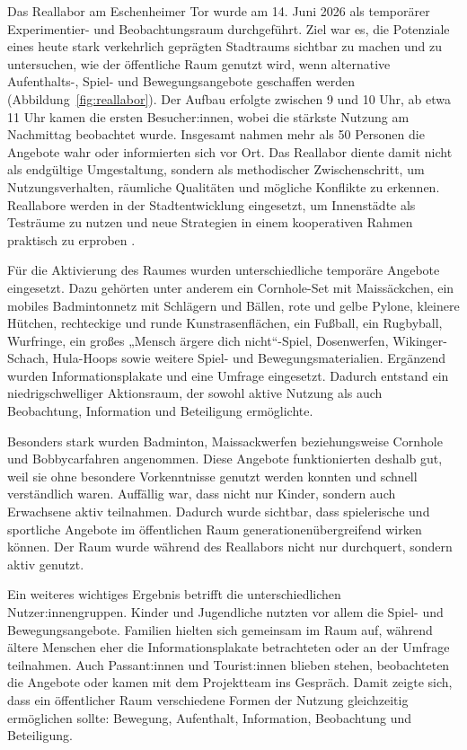 \documentclass[a4paper,12pt]{article}
\begin{document}
Das Reallabor am Eschenheimer Tor wurde am 14. Juni 2026 als temporärer Experimentier- und Beobachtungsraum durchgeführt. Ziel war es, die Potenziale eines heute stark verkehrlich geprägten Stadtraums sichtbar zu machen und zu untersuchen, wie der öffentliche Raum genutzt wird, wenn alternative Aufenthalts-, Spiel- und Bewegungsangebote geschaffen werden (Abbildung~\ref{fig:reallabor}). Der Aufbau erfolgte zwischen 9 und 10 Uhr, ab etwa 11 Uhr kamen die ersten Besucher:innen, wobei die stärkste Nutzung am Nachmittag beobachtet wurde. Insgesamt nahmen mehr als 50 Personen die Angebote wahr oder informierten sich vor Ort. Das Reallabor diente damit nicht als endgültige Umgestaltung, sondern als methodischer Zwischenschritt, um Nutzungsverhalten, räumliche Qualitäten und mögliche Konflikte zu erkennen. Reallabore werden in der Stadtentwicklung eingesetzt, um Innenstädte als Testräume zu nutzen und neue Strategien in einem kooperativen Rahmen praktisch zu erproben \autocite{bbsrziz2025}.

Für die Aktivierung des Raumes wurden unterschiedliche temporäre Angebote eingesetzt. Dazu gehörten unter anderem ein Cornhole-Set mit Maissäckchen, ein mobiles Badmintonnetz mit Schlägern und Bällen, rote und gelbe Pylone, kleinere Hütchen, rechteckige und runde Kunstrasenflächen, ein Fußball, ein Rugbyball, Wurfringe, ein großes „Mensch ärgere dich nicht“-Spiel, Dosenwerfen, Wikinger-Schach, Hula-Hoops sowie weitere Spiel- und Bewegungsmaterialien. Ergänzend wurden Informationsplakate und eine Umfrage eingesetzt. Dadurch entstand ein niedrigschwelliger Aktionsraum, der sowohl aktive Nutzung als auch Beobachtung, Information und Beteiligung ermöglichte.

Besonders stark wurden Badminton, Maissackwerfen beziehungsweise Cornhole und Bobbycarfahren angenommen. Diese Angebote funktionierten deshalb gut, weil sie ohne besondere Vorkenntnisse genutzt werden konnten und schnell verständlich waren. Auffällig war, dass nicht nur Kinder, sondern auch Erwachsene aktiv teilnahmen. Dadurch wurde sichtbar, dass spielerische und sportliche Angebote im öffentlichen Raum generationenübergreifend wirken können. Der Raum wurde während des Reallabors nicht nur durchquert, sondern aktiv genutzt.

Ein weiteres wichtiges Ergebnis betrifft die unterschiedlichen Nutzer:innengruppen. Kinder und Jugendliche nutzten vor allem die Spiel- und Bewegungsangebote. Familien hielten sich gemeinsam im Raum auf, während ältere Menschen eher die Informationsplakate betrachteten oder an der Umfrage teilnahmen. Auch Passant:innen und Tourist:innen blieben stehen, beobachteten die Angebote oder kamen mit dem Projektteam ins Gespräch. Damit zeigte sich, dass ein öffentlicher Raum verschiedene Formen der Nutzung gleichzeitig ermöglichen sollte: Bewegung, Aufenthalt, Information, Beobachtung und Beteiligung.
\end{document}
